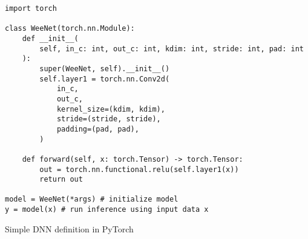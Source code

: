 \begin{listing}[!ht]
  \centering
\begin{verbatim}
import torch

class WeeNet(torch.nn.Module):
    def __init__(
        self, in_c: int, out_c: int, kdim: int, stride: int, pad: int
    ):
        super(WeeNet, self).__init__()
        self.layer1 = torch.nn.Conv2d(
            in_c,
            out_c,
            kernel_size=(kdim, kdim),
            stride=(stride, stride),
            padding=(pad, pad),
        )

    def forward(self, x: torch.Tensor) -> torch.Tensor:
        out = torch.nn.functional.relu(self.layer1(x))
        return out

model = WeeNet(*args) # initialize model
y = model(x) # run inference using input data x
\end{verbatim}
\caption{Simple DNN definition in PyTorch}
\label{lst:model:weenet}
\end{listing}
